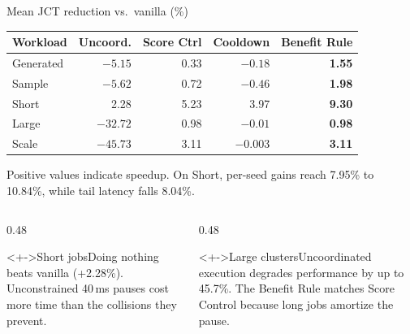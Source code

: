 \documentclass[aspectratio=169,11pt,c]{beamer}
\begin{document}
\begin{frame}{Mean JCT reduction vs.\ vanilla (\%)}
  \centering
  \begin{tabular}{lrrrr}
    \toprule
    Workload & Uncoord. & Score Ctrl & Cooldown & \alert{Benefit Rule} \\
    \midrule
    Generated & $-5.15$ & 0.33 & $-0.18$ & \textbf{1.55} \\
    Sample & $-5.62$ & 0.72 & $-0.46$ & \textbf{1.98} \\
    Short & 2.28 & 5.23 & 3.97 & \textbf{9.30} \\
    Large & $-32.72$ & 0.98 & $-0.01$ & \textbf{0.98} \\
    Scale & $-45.73$ & 3.11 & $-0.003$ & \textbf{3.11} \\
    \bottomrule
  \end{tabular}

  \vspace{0.3em}
  {\scriptsize Positive values indicate speedup. On Short, per-seed gains reach 7.95\% to 10.84\%, while tail latency falls 8.04\%.}
  \begin{columns}[T]
    \begin{column}{0.48\textwidth}
      \begin{alertblock}<+->{Short jobs}\scriptsize Doing nothing beats vanilla (+2.28\%). Unconstrained 40\,ms pauses cost more time than the collisions they prevent.\end{alertblock}
    \end{column}
    \begin{column}{0.48\textwidth}
      \begin{block}<+->{Large clusters}\scriptsize Uncoordinated execution degrades performance by up to 45.7\%. The Benefit Rule matches Score Control because long jobs amortize the pause.\end{block}
    \end{column}
  \end{columns}
\end{frame}
\end{document}
